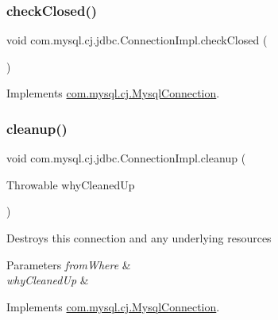 \subsubsection{\texorpdfstring{check\+Closed()}{checkClosed()}}
{\footnotesize\ttfamily void com.\+mysql.\+cj.\+jdbc.\+Connection\+Impl.\+check\+Closed (\begin{DoxyParamCaption}{ }\end{DoxyParamCaption})}



Implements \mbox{\hyperlink{interfacecom_1_1mysql_1_1cj_1_1_mysql_connection_a49756db5417b86971e0f2bb17ae71630}{com.\+mysql.\+cj.\+Mysql\+Connection}}.

\mbox{\label{classcom_1_1mysql_1_1cj_1_1jdbc_1_1_connection_impl_ac72cb58dc4f2b002b1882b69815cc64b}} 
\subsubsection{\texorpdfstring{cleanup()}{cleanup()}}
{\footnotesize\ttfamily void com.\+mysql.\+cj.\+jdbc.\+Connection\+Impl.\+cleanup (\begin{DoxyParamCaption}\item[{Throwable}]{why\+Cleaned\+Up }\end{DoxyParamCaption})}

Destroys this connection and any underlying resources


\begin{DoxyParams}{Parameters}
{\em from\+Where} & \\
\hline
{\em why\+Cleaned\+Up} & \\
\hline
\end{DoxyParams}


Implements \mbox{\hyperlink{interfacecom_1_1mysql_1_1cj_1_1_mysql_connection_a20ea00c4098425d1caa0ab9fbf28338c}{com.\+mysql.\+cj.\+Mysql\+Connection}}.

\mbox{\label{classcom_1_1mysql_1_1cj_1_1jdbc_1_1_connection_impl_ac4217c85e8137986c58604454de14cfd}} 
